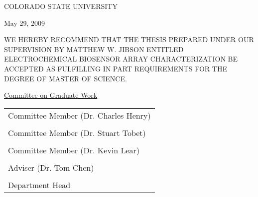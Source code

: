 \begin{center}
	COLORADO STATE UNIVERSITY
\end{center}

\vspace{0.5in}

\begin{flushright}
	May 29, 2009
\end{flushright}

WE HEREBY RECOMMEND THAT THE THESIS PREPARED UNDER OUR SUPERVISION BY MATTHEW W. JIBSON ENTITLED ELECTROCHEMICAL BIOSENSOR ARRAY CHARACTERIZATION BE ACCEPTED AS FULFILLING IN PART REQUIREMENTS FOR THE DEGREE OF MASTER OF SCIENCE.

\vspace{0.5in}

\begin{center}
	\underline{Committee on Graduate Work}\\

	\vspace{0.5in}

	\begin{tabular}{p{3in}}
		\\
		\hline Committee Member (Dr. Charles Henry)\\
		\\
		\hline Committee Member (Dr. Stuart Tobet)\\
		\\
		\hline Committee Member (Dr. Kevin Lear)\\
		\\
		\hline Adviser (Dr. Tom Chen)\\
		\\
		\hline Department Head
	\end{tabular}
\end{center}
